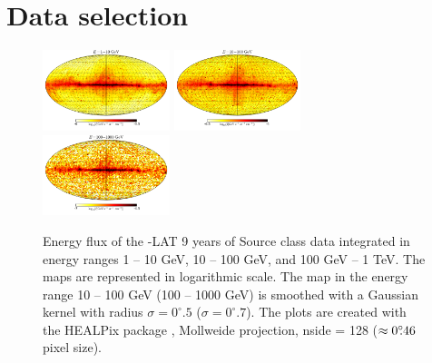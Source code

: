 \section{Data selection}


\begin{figure}[h]
\includegraphics[width=0.33\textwidth]{plots/Mollweide_data_source_range_0.pdf}
\includegraphics[width=0.33\textwidth]{plots/Mollweide_data_source_range_1.pdf}
\includegraphics[width=0.33\textwidth]{plots/Mollweide_data_source_range_2.pdf}
\caption{
Energy flux of the \Fermi-LAT 9 years of Source class data integrated in energy ranges 1 -- 10 GeV, 10 -- 100 GeV, and 100 GeV -- 1 TeV.
The maps are represented in logarithmic scale. 
The map in the energy range 10 -- 100 GeV (100 -- 1000 GeV) 
is smoothed with a Gaussian kernel with radius $\sigma = 0^\circ\!\!.5$ ($\sigma = 0^\circ\!\!.7$).
The plots are created with the HEALPix package \citep{2005ApJ...622..759G}, Mollweide projection, 
nside = 128 ($\approx 0^\circ\!\!.46$ pixel size). 
}
\label{fig:Maps_data}
\end{figure}

